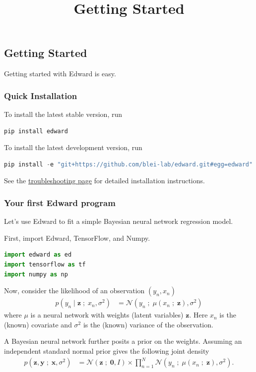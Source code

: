 \title{Getting Started}

\subsection{Getting Started}
Getting started with Edward is easy. 

\subsubsection{Quick Installation}
To install the latest stable version, run

\begin{lstlisting}[language=Java]
pip install edward
\end{lstlisting}

To install the latest development version, run

\begin{lstlisting}[language=Java]
pip install -e "git+https://github.com/blei-lab/edward.git#egg=edward"
\end{lstlisting}

See the \href{troubleshooting.html}{troubleshooting page} for detailed
installation instructions.


\subsubsection{Your first Edward program}

Let's use Edward to fit a simple Bayesian neural network regression model.

First, import Edward, TensorFlow, and Numpy.
\begin{lstlisting}[language=Python]
import edward as ed
import tensorflow as tf
import numpy as np  
\end{lstlisting}

Now, consider the likelihood of an observation $(y_n, x_n)$
\begin{align*}
  p(y_n \mid \mathbf{z} \;;\; x_n, \sigma^2)
  &=
  \mathcal{N}(y_n \;;\; \mu(x_n\;;\;\mathbf{z}), \sigma^2)
\end{align*} 
where $\mu$ is a neural network with weights (latent variables) 
$\mathbf{z}$. Here $x_n$ is the (known) covariate and $\sigma^2$ is the
(known) variance of the observation.

A Bayesian neural network further posits a prior on the weights. Assuming an
independent standard normal prior gives the following joint density
\begin{align*}
  p(\mathbf{z}, \mathbf{y} \;;\; \mathbf{x}, \sigma^2)
  &=
  \mathcal{N}(\mathbf{z} \;;\; \mathbf{0}, I)
  \times
  \prod_{n=1}^N
  \mathcal{N}(y_n \;;\; \mu(x_n\;;\;\mathbf{z}), \sigma^2).
\end{align*}

